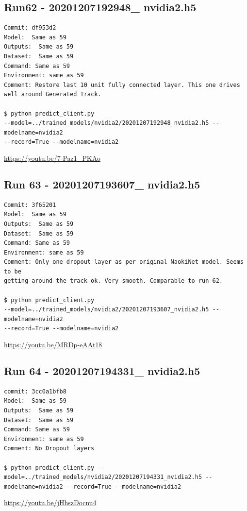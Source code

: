 \subsection{Run62 - 20201207192948\_ nvidia2.h5}
\begin{verbatim}
Commit: df953d2
Model:  Same as 59
Outputs:  Same as 59
Dataset:  Same as 59
Command: Same as 59
Environment: same as 59
Comment: Restore last 10 unit fully connected layer. This one drives well around Generated Track.

$ python predict_client.py 
--model=../trained_models/nvidia2/20201207192948_nvidia2.h5 --modelname=nvidia2 
--record=True --modelname=nvidia2
\end{verbatim}
\url{https://youtu.be/7-Paz1_PKAo}

\subsection{Run 63 - 20201207193607\_ nvidia2.h5}
\begin{verbatim}
Commit: 3f65201
Model:  Same as 59
Outputs:  Same as 59
Dataset:  Same as 59
Command: Same as 59
Environment: same as 59 
Comment: Only one dropout layer as per original NaokiNet model. Seems to be
getting around the track ok. Very smooth. Comparable to run 62.

$ python predict_client.py 
--model=../trained_models/nvidia2/20201207193607_nvidia2.h5 --modelname=nvidia2 
--record=True --modelname=nvidia2

\end{verbatim}
\url{https://youtu.be/MRDp-eAAt18}
\subsection{Run 64 - 20201207194331\_ nvidia2.h5}
\begin{verbatim}
commit: 3cc0a1bfb8
Model:  Same as 59
Outputs:  Same as 59
Dataset:  Same as 59
Command: Same as 59
Environment: same as 59 
Comment: No Dropout layers

$ python predict_client.py --model=../trained_models/nvidia2/20201207194331_nvidia2.h5 --modelname=nvidia2 --record=True --modelname=nvidia2

\end{verbatim}
\url{https://youtu.be/jHhszDocnu4}


